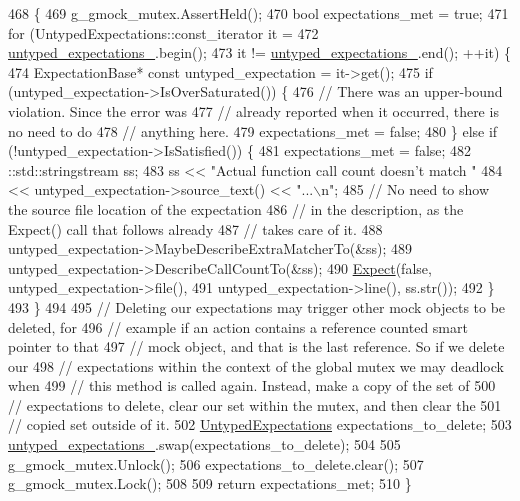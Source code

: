 \begin{DoxyCode}
468                                                   \{
469   g\_gmock\_mutex.AssertHeld();
470   \textcolor{keywordtype}{bool} expectations\_met = \textcolor{keyword}{true};
471   \textcolor{keywordflow}{for} (UntypedExpectations::const\_iterator it =
472            \hyperlink{classtesting_1_1internal_1_1UntypedFunctionMockerBase_aae4a42a4bace1fcb0cd4bdf1ddd40277}{untyped\_expectations\_}.begin();
473        it != \hyperlink{classtesting_1_1internal_1_1UntypedFunctionMockerBase_aae4a42a4bace1fcb0cd4bdf1ddd40277}{untyped\_expectations\_}.end(); ++it) \{
474     ExpectationBase* \textcolor{keyword}{const} untyped\_expectation = it->get();
475     \textcolor{keywordflow}{if} (untyped\_expectation->IsOverSaturated()) \{
476       \textcolor{comment}{// There was an upper-bound violation.  Since the error was}
477       \textcolor{comment}{// already reported when it occurred, there is no need to do}
478       \textcolor{comment}{// anything here.}
479       expectations\_met = \textcolor{keyword}{false};
480     \} \textcolor{keywordflow}{else} \textcolor{keywordflow}{if} (!untyped\_expectation->IsSatisfied()) \{
481       expectations\_met = \textcolor{keyword}{false};
482       ::std::stringstream ss;
483       ss  << \textcolor{stringliteral}{"Actual function call count doesn't match "}
484           << untyped\_expectation->source\_text() << \textcolor{stringliteral}{"...\(\backslash\)n"};
485       \textcolor{comment}{// No need to show the source file location of the expectation}
486       \textcolor{comment}{// in the description, as the Expect() call that follows already}
487       \textcolor{comment}{// takes care of it.}
488       untyped\_expectation->MaybeDescribeExtraMatcherTo(&ss);
489       untyped\_expectation->DescribeCallCountTo(&ss);
490       \hyperlink{namespacetesting_1_1internal_ab3000fc56be000e4fa6ed7cdcfee3106}{Expect}(\textcolor{keyword}{false}, untyped\_expectation->file(),
491              untyped\_expectation->line(), ss.str());
492     \}
493   \}
494 
495   \textcolor{comment}{// Deleting our expectations may trigger other mock objects to be deleted, for}
496   \textcolor{comment}{// example if an action contains a reference counted smart pointer to that}
497   \textcolor{comment}{// mock object, and that is the last reference. So if we delete our}
498   \textcolor{comment}{// expectations within the context of the global mutex we may deadlock when}
499   \textcolor{comment}{// this method is called again. Instead, make a copy of the set of}
500   \textcolor{comment}{// expectations to delete, clear our set within the mutex, and then clear the}
501   \textcolor{comment}{// copied set outside of it.}
502   \hyperlink{classtesting_1_1internal_1_1UntypedFunctionMockerBase_a36480bd395e110b4eae5b0d0402de966}{UntypedExpectations} expectations\_to\_delete;
503   \hyperlink{classtesting_1_1internal_1_1UntypedFunctionMockerBase_aae4a42a4bace1fcb0cd4bdf1ddd40277}{untyped\_expectations\_}.swap(expectations\_to\_delete);
504 
505   g\_gmock\_mutex.Unlock();
506   expectations\_to\_delete.clear();
507   g\_gmock\_mutex.Lock();
508 
509   \textcolor{keywordflow}{return} expectations\_met;
510 \}
\end{DoxyCode}
